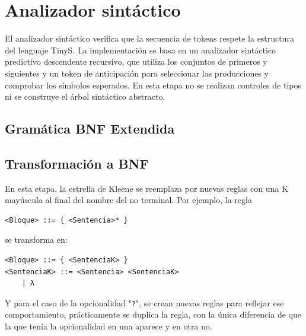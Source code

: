\chapter{Analizador sintáctico}
\label{cap:analizador-sintactico}

El analizador sintáctico verifica que la secuencia de tokens respete la
estructura del lenguaje TinyS. La implementación se basa en un analizador
sintáctico predictivo descendente recursivo, que utiliza los conjuntos
de primeros y siguientes y un token de anticipación para seleccionar las 
producciones y comprobar los símbolos esperados. En esta etapa no se realizan 
controles de tipos ni se construye el árbol sintáctico abstracto.



\section{Gramática BNF Extendida}


\section{Transformación a BNF}
En esta etapa, la estrella de Kleene se reemplaza por nuevas reglas con una K mayúscula al final del nombre del no terminal. Por ejemplo, la regla
\begin{lstlisting}[style=bnftinys]
<Bloque> ::= { <Sentencia>* }
\end{lstlisting}
se transforma en:
\begin{lstlisting}[style=bnftinys]
<Bloque> ::= { <SentenciaK> }
<SentenciaK> ::= <Sentencia> <SentenciaK>
	| λ
\end{lstlisting}
Y para el caso de la opcionalidad "\texttt{?}", se crean nuevas reglas para reflejar ese comportamiento, prácticamente se duplica la regla, con la única diferencia de que
la que tenía la opcionalidad en una aparece y en otra no.


